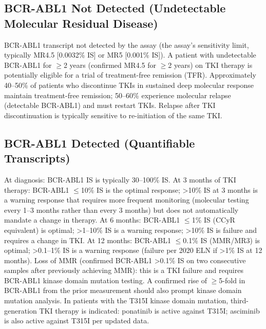 \subsection*{BCR-ABL1 Not Detected (Undetectable Molecular Residual Disease)}
BCR-ABL1 transcript not detected by the assay (the assay's sensitivity limit, typically MR4.5 [0.0032\% IS] or MR5 [0.001\% IS]). A patient with undetectable BCR-ABL1 for $\geq$2 years (confirmed MR4.5 for $\geq$2 years) on TKI therapy is potentially eligible for a trial of treatment-free remission (TFR). Approximately 40--50\% of patients who discontinue TKIs in sustained deep molecular response maintain treatment-free remission; 50--60\% experience molecular relapse (detectable BCR-ABL1) and must restart TKIs. Relapse after TKI discontinuation is typically sensitive to re-initiation of the same TKI.

\subsection*{BCR-ABL1 Detected (Quantifiable Transcripts)}
At diagnosis: BCR-ABL1 IS is typically 30--100\% IS. At 3 months of TKI therapy: BCR-ABL1 $\leq$10\% IS is the optimal response; >10\% IS at 3 months is a warning response that requires more frequent monitoring (molecular testing every 1--3 months rather than every 3 months) but does not automatically mandate a change in therapy. At 6 months: BCR-ABL1 $\leq$1\% IS (CCyR equivalent) is optimal; >1--10\% IS is a warning response; >10\% IS is failure and requires a change in TKI. At 12 months: BCR-ABL1 $\leq$0.1\% IS (MMR/MR3) is optimal; >0.1--1\% IS is a warning response (failure per 2020 ELN if >1\% IS at 12 months). Loss of MMR (confirmed BCR-ABL1 >0.1\% IS on two consecutive samples after previously achieving MMR): this is a TKI failure and requires BCR-ABL1 kinase domain mutation testing. A confirmed rise of $\geq$5-fold in BCR-ABL1 from the prior measurement should also prompt kinase domain mutation analysis. In patients with the T315I kinase domain mutation, third-generation TKI therapy is indicated: ponatinib is active against T315I; asciminib is also active against T315I per updated data.

